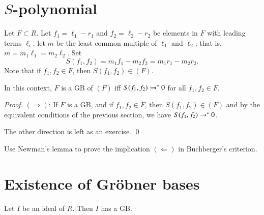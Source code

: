\documentclass{llncs}
\begin{document}
\section{$S$-polynomial}

Let $F\subset R$.
Let $f_1=\ell_1-r_1$ and $f_2=\ell_2-r_2$ be elements in $F$ with leading terms $\ell_i$.
let $m$ be the least common multiple of $\ell_1$ and $\ell_2$; that is,
$m = m_1\ell_1 = m_2\ell_2$.  Set 
\[
S(f_1,f_2) = m_1 f_1 - m_2 f_2 = m_1 r_1 - m_2 r_2.
\]
Note that if $f_1,f_2\in F$, then $S(f_1,f_2)\in (F)$.

\begin{lemma} In this context, $F$ is a GB
of $(F)$ iff $S(f_1,f_2)\rightarrow^*  0$ for all $f_1,f_2\in F$.
\end{lemma}

\begin{proof}
$(\Rightarrow)$: If $F$ is a GB, and if $f_1,f_2\in F$, then $S(f_1,f_2)\in (F)$ and by
the equivalent conditions of the previous section, we have $S(f_1,f_2)\rightarrow^* 0$.

The other direction is left as an exercise.
\qed\end{proof}

\begin{problem} Use Newman's lemma to prove the implication
$(\Leftarrow)$ in Buchberger's criterion.
\end{problem}



\section{Existence of Gr\"obner bases}

\begin{lemma}  Let $I$ be an ideal of $R$.  Then $I$ has a GB.
\end{lemma}
\end{document}
